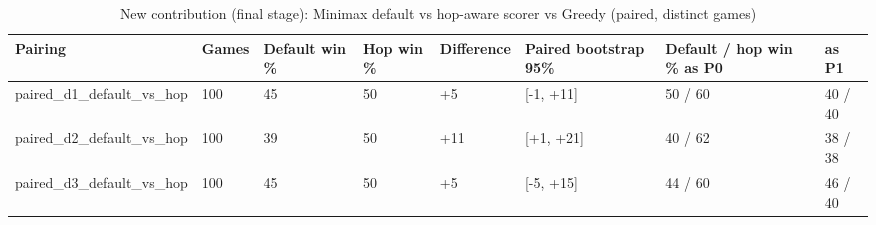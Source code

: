 \begin{table}[htbp]
\centering
\caption{New contribution (final stage): Minimax default vs hop-aware scorer vs Greedy (paired, distinct games)}
\label{tab:minimax_default_vs_hop}
\begin{tabular}{llllllll}
\toprule
Pairing & Games & Default win \% & Hop win \% & Difference & Paired bootstrap 95\% & Default / hop win \% as P0 & as P1 \\
\midrule
paired\_d1\_default\_vs\_hop & 100 & 45 & 50 & +5 & [-1, +11] & 50 / 60 & 40 / 40 \\
paired\_d2\_default\_vs\_hop & 100 & 39 & 50 & +11 & [+1, +21] & 40 / 62 & 38 / 38 \\
paired\_d3\_default\_vs\_hop & 100 & 45 & 50 & +5 & [-5, +15] & 44 / 60 & 46 / 40 \\
\bottomrule
\end{tabular}
\end{table}
